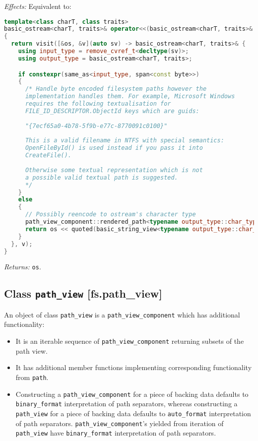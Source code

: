\documentclass[11pt]{article}
\newcommand{\code}[2][cpp]{\lstinline[language=#1,basicstyle=\small\ttfamily]{#2}}
\newcommand{\desc}[1]{\textit{#1}}
\newcommand{\effects}{\desc{Effects: }}
\newcommand{\returns}{\desc{Returns: }}
\begin{document}
\effects Equivalent to:\begin{lstlisting}[language=cpp]
template<class charT, class traits>
basic_ostream<charT, traits>& operator<<(basic_ostream<charT, traits>& os, path_view_component v)
{
  return visit([&os, &v](auto sv) -> basic_ostream<charT, traits>& {
    using input_type = remove_cvref_t<decltype(sv)>;
    using output_type = basic_ostream<charT, traits>;

    if constexpr(same_as<input_type, span<const byte>>)
    {
      /* Handle byte encoded filesystem paths however the
      implementation handles them. For example, Microsoft Windows
      requires the following textualisation for
      FILE_ID_DESCRIPTOR.ObjectId keys which are guids:
      
      "{7ecf65a0-4b78-5f9b-e77c-8770091c0100}"
      
      This is a valid filename in NTFS with special semantics:
      OpenFileById() is used instead if you pass it into
      CreateFile().
      
      Otherwise some textual representation which is not
      a possible valid textual path is suggested.
      */
    }
    else
    {
      // Possibly reencode to ostream's character type
      path_view_component::rendered_path<typename output_type::char_type> zbuff(v, path_view_component::unterminated);
      return os << quoted(basic_string_view<typename output_type::char_type>(zbuff.buffer, zbuff.length));
    }
  }, v);
}
\end{lstlisting}

\returns \code{os}.\\

\subsection*{Class \code{path_view} [fs.path\_view]}

An object of class \code{path_view} is a \code{path_view_component} which has additional functionality:
\begin{itemize}
    \item It is an iterable sequence of \code{path_view_component} returning subsets of the path view.
    \item It has additional member functions implementing corresponding functionality from \code{path}.
    \item Constructing a \code{path_view_component} for a piece of backing data defaults to \code{binary_format} interpretation of path separators, whereas constructing a \code{path_view} for a piece of backing data defaults to \code{auto_format} interpretation of path separators. \code{path_view_component}'s yielded from iteration of \code{path_view} have \code{binary_format} interpretation of path separators.
\end{itemize}
\end{document}
